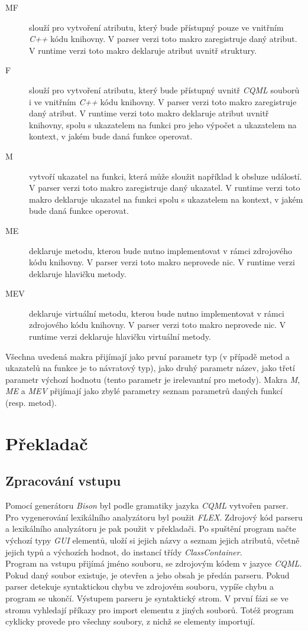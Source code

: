 \documentclass[11pt,twoside,a4paper]{book}
\begin{document}
\begin{description}
\item[MF] slouží pro vytvoření atributu, který bude přístupný pouze ve vnitřním \textit{C++} kódu knihovny. V parser verzi toto makro zaregistruje daný atribut. V runtime verzi toto makro deklaruje atribut uvnitř struktury.
\item[F] slouží pro vytvoření atributu, který bude přístupný uvnitř \textit{CQML} souborů i ve vnitřním \textit{C++} kódu knihovny. V parser verzi toto makro zaregistruje daný atribut. V runtime verzi toto makro deklaruje atribut uvnitř knihovny, spolu s ukazatelem na funkci pro jeho výpočet a ukazatelem na kontext, v jakém bude daná funkce  operovat.
\item[M] vytvoří ukazatel na funkci, která může sloužit například k obsluze událostí. V parser verzi toto makro zaregistruje daný ukazatel. V runtime verzi toto makro deklaruje ukazatel na funkci spolu s ukazatelem na kontext, v jakém bude daná funkce operovat. 
\item[ME] deklaruje metodu, kterou bude nutno implementovat v rámci zdrojového kódu knihovny. V parser verzi toto makro neprovede nic. V runtime verzi deklaruje hlavičku metody.
\item[MEV] deklaruje virtuální metodu, kterou bude nutno implementovat v rámci zdrojového kódu knihovny. V parser verzi toto makro neprovede nic. V runtime verzi deklaruje hlavičku virtuální metody.
\end{description}
Všechna uvedená makra přijímají jako první parametr typ (v případě metod a ukazatelů na funkce je to návratový typ), jako druhý parametr název, jako třetí parametr výchozí hodnotu (tento parametr je irelevantní pro metody). Makra \textit{M}, \textit{ME} a \textit{MEV} přijímají jako zbylé parametry seznam parametrů daných funkcí (resp. metod).\\



\section{\label{SEC:transImpl}Překladač}
\subsection{Zpracování vstupu}
Pomocí generátoru \textit{Bison} byl podle gramatiky jazyka \textit{CQML} vytvořen parser. Pro vygenerování lexikálního analyzátoru byl použit \textit{FLEX}. Zdrojový kód parseru a lexikálního analyzátoru je pak použit v překladači.
Po spuštění program načte výchozí typy \textit{GUI} elementů, uloží si jejich názvy a seznam jejich atributů, včetně jejich typů a výchozích hodnot, do instancí třídy \textit{ClassContainer}.\\
Program na vstupu přijímá jméno souboru, se zdrojovým kódem v jazyce \textit{CQML}. Pokud daný soubor existuje, je otevřen a jeho obsah je předán parseru. Pokud parser detekuje syntaktickou chybu ve zdrojovém souboru, vypíše chybu a program se ukončí. Výstupem parseru je syntaktický strom. V první fázi se ve stromu vyhledají příkazy pro import elementu z jiných souborů. Totéž program cyklicky provede pro všechny soubory, z nichž se elementy importují.
\end{document}
